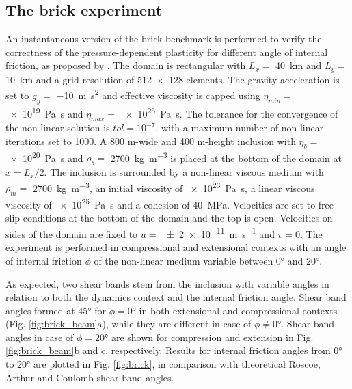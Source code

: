 \documentclass[hidelinks,11pt,a4paper]{article}
\begin{document}
\subsection{The brick experiment}\label{sec:brick}
An instantaneous version of the brick benchmark is performed to verify the correctness of the pressure-dependent plasticity for different angle of internal friction, as proposed by \citet{Glerum2018}. The domain is rectangular with $L_x=$ \SI{40}{\km} and $L_y=$ \SI{10}{\km} and a grid resolution of \num{512x128} elements. The gravity acceleration is set to $g_y=$ \SI{-10}{\m\square\s} and effective viscosity is capped using $\eta_{min}=$ \SI{e19}{\pascal\s} and $\eta_{max}=$ \SI{e26}{\pascal\s}. The tolerance for the convergence of the non-linear solution is $tol=10^{-7}$, with a maximum number of non-linear iterations set to 1000. A 800 m-wide and 400 m-height inclusion with $\eta_b=$ \SI{e20}{\pascal\s} and $\rho_b=$ \SI{2700}{\kg\per\cubic\m} is placed at the bottom of the domain at $x=L_x/2$. The inclusion is surrounded by a non-linear viscous medium with $\rho_m=$ \SI{2700}{\kg\per\cubic\m}, an initial viscosity of \SI{e23}{\pascal\s}, a linear viscous viscosity of \SI{e25}{\pascal\s} and a cohesion of \SI{40}{\mega\pascal}. Velocities are set to free slip conditions at the bottom of the domain and the top is open. Velocities on sides of the domain are fixed to $u=$ \SI{+-2e-11}{\m\per\s} and $v=0$. The experiment is performed in compressional and extensional contexts with an angle of internal friction $\phi$ of the non-linear medium variable between 0° and 20°.

As expected, two shear bands stem from the inclusion with variable angles in relation to both the dynamics context and the internal friction angle. Shear band angles formed at 45° for $\phi=0$° in both extensional and compressional contexts (Fig. \ref{fig:brick_beam}a), while they are different in case of $\phi\neq0$°. Shear band angles in case of $\phi=20$° are shown for compression and extension in Fig. \ref{fig:brick_beam}b  and c, respectively. Results for internal friction angles from 0° to 20° are plotted in Fig. \ref{fig:brick}, in comparison with theoretical Roscoe, Arthur and Coulomb shear band angles. 
\end{document}
